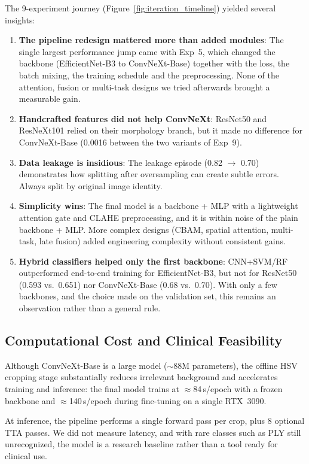 \documentclass[twocolumn,a4paper]{article}
\begin{document}
The 9-experiment journey (Figure~\ref{fig:iteration_timeline}) yielded several insights:

\begin{enumerate}
    \item \textbf{The pipeline redesign mattered more than added modules}: The single largest performance jump came with Exp~5, which changed the backbone (EfficientNet-B3 to ConvNeXt-Base) together with the loss, the batch mixing, the training schedule and the preprocessing. None of the attention, fusion or multi-task designs we tried afterwards brought a measurable gain.
    \item \textbf{Handcrafted features did not help ConvNeXt}: ResNet50 and ResNeXt101 relied on their morphology branch, but it made no difference for ConvNeXt-Base (0.0016 between the two variants of Exp~9).
    \item \textbf{Data leakage is insidious}: The leakage episode (0.82 $\to$ 0.70) demonstrates how splitting after oversampling can create subtle errors. Always split by original image identity.
    \item \textbf{Simplicity wins}: The final model is a backbone + MLP with a lightweight attention gate and CLAHE preprocessing, and it is within noise of the plain backbone + MLP. More complex designs (CBAM, spatial attention, multi-task, late fusion) added engineering complexity without consistent gains.
    \item \textbf{Hybrid classifiers helped only the first backbone}: CNN+SVM/RF outperformed end-to-end training for EfficientNet-B3, but not for ResNet50 (0.593 vs.\ 0.651) nor ConvNeXt-Base (0.68 vs.\ 0.70). With only a few backbones, and the choice made on the validation set, this remains an observation rather than a general rule.
\end{enumerate}

\subsection{Computational Cost and Clinical Feasibility}

Although ConvNeXt-Base is a large model ($\sim$88M parameters), the offline HSV cropping stage substantially reduces irrelevant background and accelerates training and inference: the final model trains at $\approx$84\,s/epoch with a frozen backbone and $\approx$140\,s/epoch during fine-tuning on a single RTX~3090.

At inference, the pipeline performs a single forward pass per crop, plus 8 optional TTA passes. We did not measure latency, and with rare classes such as PLY still unrecognized, the model is a research baseline rather than a tool ready for clinical use.
\end{document}
